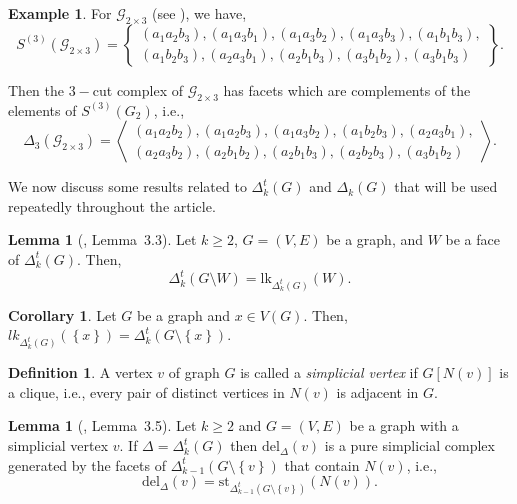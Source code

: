 \documentclass[11pt,reqno,a4paper]{amsart}
\theoremstyle{definition}
\newtheorem{definition}{Definition}[section]
\newtheorem{example}{Example}[definition]
\theoremstyle{theorem}
\newtheorem{lemma}[theorem]{Lemma}
\newtheorem{corollary}[theorem]{Corollary}
\newcommand{\totalkcut}{\Delta_{k}^t}
\newcommand{\totalkcutn}{\Delta_{k-1}^t}
\newcommand{\kcut}{\Delta_{k}}
\newcommand{\lno}{\left(}
\newcommand{\rno}{\right)}
\newcommand{\lsq}{\left[}
\newcommand{\rsq}{\right]}
\newcommand{\lcu}{\left\{}
\newcommand{\rcu}{\right\}}
\newcommand{\lk}{\mathrm{lk}}
\newcommand{\del}{\mathrm{del}}
\newcommand{\st}{\mathrm{st}}
\theoremstyle{remark}
\begin{document}
\begin{example}
    For $\mathcal{G}_{2\times 3}$ (see ), we have,
    $$ S^{(3)}\lno \mathcal{G}_{2\times 3} \rno = \lcu \begin{split}
        \lno a_1 a_2 b_3 \rno, \lno a_1 a_3 b_1 \rno, \lno a_1 a_3 b_2 \rno, \lno a_1 a_3 b_3 \rno, \lno a_1 b_1 b_3 \rno,\\
        \lno a_1 b_2 b_3 \rno, \lno a_2 a_3 b_1 \rno, \lno a_2 b_1 b_3 \rno, \lno a_3 b_1 b_2 \rno, \lno a_3 b_1 b_3 \rno
    \end{split} \rcu.$$

    Then the $3-$cut complex of $\mathcal{G}_{2\times 3}$ has facets which are complements of the elements of $S^{(3)} \lno G_2 \rno$, i.e., 
    $$ \Delta_3\lno \mathcal{G}_{2\times 3} \rno = \left\langle
    \begin{split}
        \lno a_1 a_2 b_2 \rno, \lno a_1 a_2 b_3 \rno, \lno a_1 a_3 b_2 \rno, \lno a_1 b_2 b_3 \rno, \lno a_2 a_3 b_1 \rno,\\
        \lno a_2 a_3 b_2 \rno, \lno a_2 b_1 b_2 \rno, \lno a_2 b_1 b_3 \rno, \lno a_2 b_2 b_3 \rno, \lno a_3 b_1 b_2 \rno
    \end{split} \right\rangle.$$
\end{example}


We now discuss some results related to $\totalkcut\lno G \rno$ and $\kcut \lno G \rno$ that will be used repeatedly throughout the article.

\begin{lemma}[\cite{bayer2024total}, Lemma~3.3]\label{lemma: link}
    Let $k\geq 2$, $G = \lno V,E\rno$ be a graph, and $W$ be a face of $\totalkcut\lno G\rno$. Then, 
    $$\totalkcut\lno G \setminus W\rno = \lk_{\totalkcut\lno G\rno}\lno W\rno.$$
\end{lemma}
\begin{corollary}\label{coro:link of a vertex}
    Let $G$ be a graph and $x\in V(G)$. Then, $lk_{\totalkcut\lno G\rno}\lno \lcu x\rcu\rno = \totalkcut\lno G\setminus \lcu x\rcu\rno$.
\end{corollary}

\begin{definition}
    A vertex $v$ of graph $G$ is called a \textit{simplicial vertex} if $G\lsq N\lno v\rno\rsq$ is a clique, i.e., every pair of distinct vertices in $N\lno v\rno$ is adjacent in $G$.
\end{definition}

\begin{lemma}[\cite{bayer2024total}, Lemma~3.5]\label{lemma: deletion of v}
    Let $k\geq2$ and $G = \lno V, E\rno$ be a graph with a simplicial vertex $v$. If $\Delta = \totalkcut\lno G\rno$ then $\del_{\Delta}\lno v\rno$ is a pure simplicial complex generated by the facets of $\totalkcutn\lno G\setminus\lcu v\rcu\rno$ that contain $N\lno v\rno$, i.e.,
    $$\del_{\Delta}\lno v\rno = \st_{\totalkcutn\lno G\setminus\lcu v\rcu\rno}\lno N\lno v\rno\rno.$$
\end{lemma}
\end{document}
